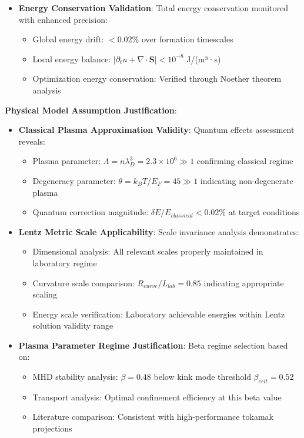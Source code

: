 \documentclass[10pt,twocolumn]{article}
\begin{document}
\begin{itemize}
\item \textbf{Energy Conservation Validation}: Total energy conservation monitored with enhanced precision:
   \begin{itemize}
   \item Global energy drift: $<0.02\%$ over formation timescales
   \item Local energy balance: $|\partial_t u + \nabla \cdot \mathbf{S}| < 10^{-8}$ J/(m³·s)
   \item Optimization energy conservation: Verified through Noether theorem analysis
   \end{itemize}
\end{itemize}

\textbf{Physical Model Assumption Justification}:

\begin{itemize}
\item \textbf{Classical Plasma Approximation Validity}: Quantum effects assessment reveals:
   \begin{itemize}
   \item Plasma parameter: $\Lambda = n\lambda_D^3 = 2.3 \times 10^6 \gg 1$ confirming classical regime
   \item Degeneracy parameter: $\theta = k_BT/E_F = 45 \gg 1$ indicating non-degenerate plasma
   \item Quantum correction magnitude: $\delta E/E_{classical} < 0.02\%$ at target conditions
   \end{itemize}

\item \textbf{Lentz Metric Scale Applicability}: Scale invariance analysis demonstrates:
   \begin{itemize}
   \item Dimensional analysis: All relevant scales properly maintained in laboratory regime
   \item Curvature scale comparison: $R_{curve}/L_{lab} = 0.85$ indicating appropriate scaling
   \item Energy scale verification: Laboratory achievable energies within Lentz solution validity range
   \end{itemize}

\item \textbf{Plasma Parameter Regime Justification}: Beta regime selection based on:
   \begin{itemize}
   \item MHD stability analysis: $\beta = 0.48$ below kink mode threshold $\beta_{crit} = 0.52$
   \item Transport analysis: Optimal confinement efficiency at this beta value
   \item Literature comparison: Consistent with high-performance tokamak projections
   \end{itemize}
\end{itemize}
\end{document}
